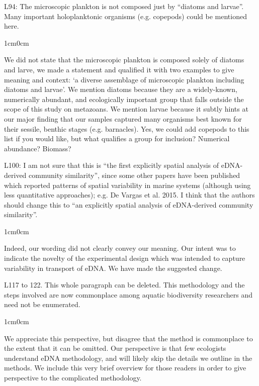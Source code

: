 \documentclass{article}
\newenvironment{response}
	{
	\begin{adjustwidth}{1cm}{0cm}
	\itshape %
	}
	{
	\end{adjustwidth}
	}
\begin{document}
L94: The microscopic plankton is not composed just by ``diatoms and larvae''. Many important holoplanktonic organisms (e.g. copepods) could be mentioned here.
\begin{response}
  We did not state that the microscopic plankton is composed solely of diatoms and larve, we made a  statement and qualified it with two examples to give meaning and context: `a diverse assemblage of microscopic plankton including diatoms and larvae'. We mention diatoms because they are a widely-known, numerically abundant, and ecologically important group that falls outside the scope of this study on metazoans. We mention larvae because it subtly hints at our major finding that our samples captured many organisms best known for their sessile, benthic stages (e.g. barnacles). Yes, we could add copepods to this list if you would like, but what qualifies a group for inclusion? Numerical abundance? Biomass?\\
\end{response}

L100: I am not sure that this is ``the first explicitly spatial analysis of eDNA-derived community similarity'', since some other papers have been published which reported patterns of spatial variability in marine systems (although using less quantitative approaches); e.g. De Vargas et al. 2015. I think that the authors should change this to ``an explicitly spatial analysis of eDNA-derived community similarity''.
\begin{response}
  Indeed, our wording did not clearly convey our meaning. Our intent was to indicate the novelty of the experimental design which was intended to capture variability in transport of eDNA. We have made the suggested change.\\
\end{response}

L117 to 122. This whole paragraph can be deleted. This methodology and the steps involved are now commonplace among aquatic biodiversity researchers and need not be enumerated.
\begin{response}
  We appreciate this perspective, but disagree that the method is commonplace to the extent that it can be omitted. Our perspective is that few ecologists understand eDNA methodology, and will likely skip the details we outline in the methods. We include this very brief overview for those readers in order to give perspective to the complicated methodology.\\
\end{response}
\end{document}
